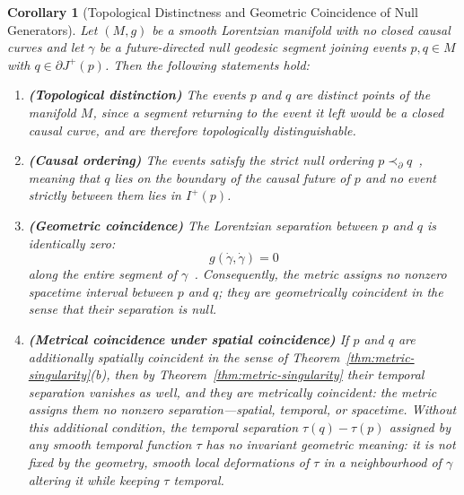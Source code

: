 \documentclass[11pt,a4paper]{article}
\theoremstyle{plain}
\newtheorem{corollary}{Corollary}
\theoremstyle{remark}
\begin{document}
\begin{corollary}[Topological Distinctness and Geometric Coincidence of Null Generators]\label{cor:threefold}
Let $(M,g)$ be a smooth Lorentzian manifold with no closed causal curves and let $\gamma$ be a future-directed null geodesic segment joining events $p,q\in M$ with $q\in\partial J^{+}(p)$. Then the following statements hold:

\begin{enumerate}
    \item[(i)] \textbf{(Topological distinction)}  
    The events $p$ and $q$ are distinct points of the manifold $M$, since a segment returning to the event it left would be a closed causal curve, and are therefore topologically distinguishable.

    \item[(ii)] \textbf{(Causal ordering)}  
    The events satisfy the strict null ordering $p \prec_{\partial} q$~\cite{penrose1972}, meaning that $q$ lies on the boundary of the causal future of $p$ and no event strictly between them lies in $I^{+}(p)$.

    \item[(iii)] \textbf{(Geometric coincidence)}  
    The Lorentzian separation between $p$ and $q$ is identically zero:
    \[g(\dot\gamma,\dot\gamma) = 0\]
    along the entire segment of $\gamma$~\cite{Wald1984}. 
    Consequently, the metric assigns no nonzero spacetime interval between $p$ and $q$; they are \emph{geometrically coincident} in the sense that their separation is null.

    \item[(iv)] \textbf{(Metrical coincidence under spatial coincidence)}  
    If $p$ and $q$ are additionally spatially coincident in the sense of Theorem~\ref{thm:metric-singularity}(b), then by Theorem~\ref{thm:metric-singularity} their temporal separation vanishes as well, and they are metrically coincident: the metric assigns them no nonzero separation---spatial, temporal, or spacetime. Without this additional condition, the temporal separation $\tau(q)-\tau(p)$ assigned by any smooth temporal function $\tau$ has no invariant geometric meaning: it is not fixed by the geometry, smooth local deformations of $\tau$ in a neighbourhood of $\gamma$ altering it while keeping $\tau$ temporal.

\end{enumerate}
\end{corollary}
\end{document}
